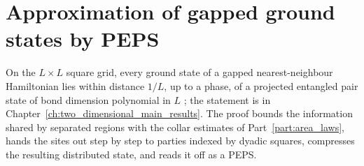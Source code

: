 \part{Approximation of gapped ground states by PEPS}
\label{part:peps_approximation}

On the $L\times L$ square grid, every ground state of a gapped
nearest-neighbour Hamiltonian lies within distance $1/L$, up to a phase, of a
projected entangled pair state of bond dimension polynomial in $L$
\cite{OpenAI2026PolynomialPEPS}; the statement is in
Chapter~\ref{ch:two_dimensional_main_results}. The proof bounds the
information shared by separated regions with the collar estimates of
Part~\ref{part:area_laws}, hands the sites out step by step to parties indexed
by dyadic squares, compresses the resulting distributed state, and reads it off
as a PEPS.
